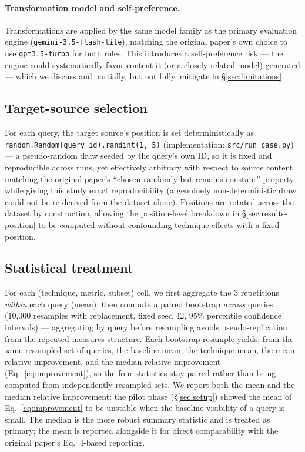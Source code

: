 \documentclass[11pt,a4paper]{article}
\begin{document}
\paragraph{Transformation model and self-preference.} Transformations are
applied by the same model family as the primary evaluation engine
(\texttt{gemini-3.5-flash-lite}), matching the original paper's own choice
to use \texttt{gpt3.5-turbo} for both roles. This introduces a
self-preference risk --- the engine could systematically favor content it (or
a closely related model) generated --- which we discuss and partially, but
not fully, mitigate in \S\ref{sec:limitations}.

\subsection{Target-source selection}
\label{sec:target-source}

For each query, the target source's position is set deterministically as
\texttt{random.Random(query\_id).randint(1, 5)} (implementation:
\texttt{src/run\_case.py}) --- a pseudo-random draw seeded by the query's own
ID, so it is fixed and reproducible across runs, yet effectively arbitrary
with respect to source content, matching the original paper's ``chosen
randomly but remains constant'' property while giving this study exact
reproducibility (a genuinely non-deterministic draw could not be re-derived
from the dataset alone). Positions are rotated across the dataset by
construction, allowing the position-level breakdown in
\S\ref{sec:results-position} to be computed without confounding technique
effects with a fixed position.

\subsection{Statistical treatment}
\label{sec:stats}

For each (technique, metric, subset) cell, we first aggregate the 3
repetitions \emph{within} each query (mean), then compute a paired
bootstrap \emph{across} queries (10{,}000 resamples with replacement, fixed
seed 42, 95\% percentile confidence intervals) --- aggregating by query before
resampling avoids pseudo-replication from the repeated-measures structure.
Each bootstrap resample yields, from the same resampled set of queries, the
baseline mean, the technique mean, the mean relative improvement, and the
median relative improvement (Eq.~\ref{eq:improvement}), so the four
statistics stay paired rather than being computed from independently
resampled sets. We report both the mean and the median relative
improvement: the pilot phase (\S\ref{sec:setup}) showed the mean of
Eq.~\ref{eq:improvement} to be unstable when the baseline visibility of a
query is small. The median is the more robust summary statistic and is
treated as primary; the mean is reported alongside it for direct
comparability with the original paper's Eq.~4-based reporting.
\end{document}
